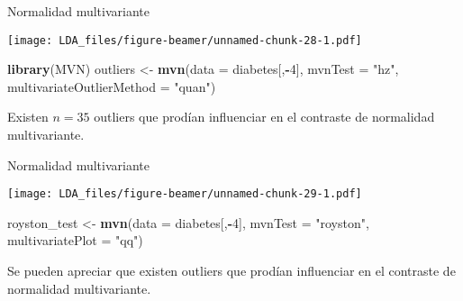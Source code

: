 \documentclass[ignorenonframetext,]{beamer}
\newenvironment{Shaded}{\begin{snugshade}}{\end{snugshade}}
\newcommand{\KeywordTok}[1]{\textcolor[rgb]{0.13,0.29,0.53}{\textbf{#1}}}
\newcommand{\DataTypeTok}[1]{\textcolor[rgb]{0.13,0.29,0.53}{#1}}
\newcommand{\DecValTok}[1]{\textcolor[rgb]{0.00,0.00,0.81}{#1}}
\newcommand{\StringTok}[1]{\textcolor[rgb]{0.31,0.60,0.02}{#1}}
\newcommand{\OperatorTok}[1]{\textcolor[rgb]{0.81,0.36,0.00}{\textbf{#1}}}
\newcommand{\NormalTok}[1]{#1}
\begin{document}
\begin{frame}[fragile]{Normalidad multivariante}

\hypertarget{left}{}
\texttt{[image: LDA\_files/figure-beamer/unnamed-chunk-28-1.pdf]}

\hypertarget{right}{}
\begin{Shaded}
\begin{Highlighting}[]
\KeywordTok{library}\NormalTok{(MVN)}
\NormalTok{outliers <-}\StringTok{ }\KeywordTok{mvn}\NormalTok{(}\DataTypeTok{data =}\NormalTok{ diabetes[,}\OperatorTok{-}\DecValTok{4}\NormalTok{], }\DataTypeTok{mvnTest =} \StringTok{"hz"}\NormalTok{, }\DataTypeTok{multivariateOutlierMethod =} \StringTok{"quan"}\NormalTok{)}
\end{Highlighting}
\end{Shaded}

Existen \(n=35\) outliers que prodían influenciar en el contraste de
normalidad multivariante.

\end{frame}

\begin{frame}[fragile]{Normalidad multivariante}

\hypertarget{left}{}
\texttt{[image: LDA\_files/figure-beamer/unnamed-chunk-29-1.pdf]}

\hypertarget{right}{}
\begin{Shaded}
\begin{Highlighting}[]
\NormalTok{royston_test <-}\StringTok{ }\KeywordTok{mvn}\NormalTok{(}\DataTypeTok{data =}\NormalTok{ diabetes[,}\OperatorTok{-}\DecValTok{4}\NormalTok{], }\DataTypeTok{mvnTest =} \StringTok{"royston"}\NormalTok{, }\DataTypeTok{multivariatePlot =} \StringTok{"qq"}\NormalTok{)}
\end{Highlighting}
\end{Shaded}

Se pueden apreciar que existen outliers que prodían influenciar en el
contraste de normalidad multivariante.

\end{frame}
\end{document}
